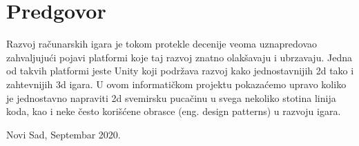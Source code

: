 \clearpage
\justify
\thispagestyle{empty}
\section*{Predgovor}

Razvoj ra\v{c}unarskih igara je tokom protekle decenije veoma uznapredovao zahvaljuju\'ci pojavi
platformi koje taj razvoj znatno olak\v{s}avaju i ubrzavaju. Jedna od takvih platformi jeste Unity koji
podr\v{z}ava razvoj kako jednostavnijih 2d tako i zahtevnijih 3d igara. U ovom informati\v{c}kom projektu
pokaza\'cemo upravo koliko je jednostavno napraviti 2d svemirsku puca\v{c}inu u svega nekoliko stotina
linija koda, kao i neke \v{c}esto kori\v{s}\'cene obrasce (eng. design patterns) u razvoju igara.

\vspace{3cm}
\noindent
\textbf{\thesisauthor{}} 

\vspace{0.2cm}
\noindent
Novi Sad, Septembar 2020.
